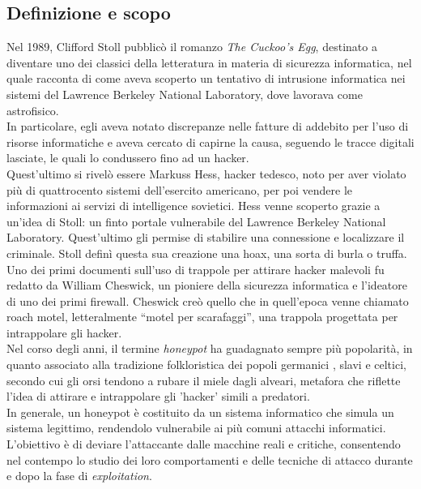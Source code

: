 \documentclass[12pt,a4paper,oneside,onecolumn,openright]{book}
\begin{document}
	\subsection{Definizione e scopo}
	Nel 1989, Clifford Stoll pubblicò il romanzo \textit{The Cuckoo’s Egg}, destinato a diventare uno dei classici della letteratura in materia di sicurezza informatica, nel quale racconta di come aveva scoperto un tentativo di intrusione informatica nei sistemi del Lawrence Berkeley National Laboratory, dove lavorava come astrofisico. \\
	In particolare, egli aveva notato discrepanze nelle fatture di addebito per l’uso di risorse informatiche e aveva cercato di capirne la causa, seguendo le tracce digitali lasciate, le quali lo condussero fino ad un hacker. \\
	Quest’ultimo si rivelò essere Markuss Hess, hacker tedesco, noto per aver violato più di quattrocento sistemi dell’esercito americano, per poi vendere le informazioni ai servizi di intelligence sovietici. Hess venne scoperto grazie a un’idea di Stoll: un finto portale vulnerabile del Lawrence Berkeley National Laboratory. Quest'ultimo gli permise di stabilire una connessione e localizzare il criminale. Stoll definì questa sua creazione una hoax, una sorta di burla o truffa.\cite{TheCuckoosEgg}\\
	Uno dei primi documenti sull'uso di trappole per attirare hacker malevoli fu redatto da William Cheswick, un pioniere della sicurezza informatica e l'ideatore di uno dei primi firewall. Cheswick creò quello che in quell'epoca venne chiamato roach motel, letteralmente “motel per scarafaggi”, una trappola progettata per intrappolare gli hacker.\cite{cheswick}\\
	Nel corso degli anni, il termine \textit{honeypot} ha guadagnato sempre più popolarità, in quanto associato alla tradizione folkloristica dei popoli germanici \cite{bear}, slavi e celtici, secondo cui gli orsi tendono a rubare il miele dagli alveari, metafora che riflette l'idea di attirare e intrappolare gli 'hacker' simili a predatori.\\
	In generale, un honeypot è costituito da un sistema informatico che simula un sistema legittimo, rendendolo vulnerabile ai più comuni attacchi informatici. L'obiettivo è di deviare l'attaccante dalle macchine reali e critiche, consentendo nel contempo lo studio dei loro comportamenti e delle tecniche di attacco durante e dopo la fase di \textit{exploitation}.\\
	
\end{document}

